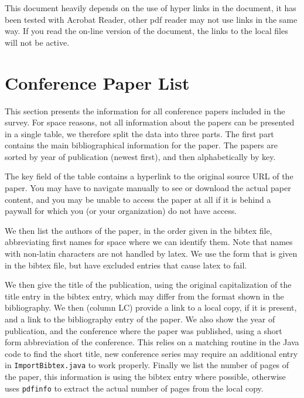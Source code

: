 \documentclass[a4paper]{article}
\begin{document}
This document heavily depends on the use of hyper links in the document, it has been tested with Acrobat Reader, other pdf reader may not use links in the same way. If you read the on-line version of the document, the links to the local files will not be active.

\clearpage


\section{Conference Paper List}

This section presents the information for all conference papers included in the survey. For space reasons, not all information about the papers can be presented in a single table, we therefore split the data into three parts. The first part contains the main bibliographical information for the paper. The papers are sorted by year of publication (newest first), and then alphabetically by key. 

The key field of the table contains a hyperlink to the original source URL of the paper. You may have to navigate manually to see or download the actual paper content, and you may be unable to access the paper at all if it is behind a paywall for which you (or your organization) do not have access.

We then list the authors of the paper, in the order given in the bibtex file, abbreviating first names for space where we can identify them. Note that names with non-latin characters are not handled by latex. We use the form that is given in the bibtex file, but have excluded entries that cause latex to fail.  

We then give the title of the publication, using the original capitalization of the title entry in the bibtex entry, which may differ from the format shown in the bibliography. We then (column LC) provide a link to a local copy, if it is present, and a link to the bibliography entry of the paper.  We also show the year of publication, and the conference where the paper was published, using a short form abbreviation of the conference. This relies on a matching routine in the Java code to find the short title, new conference series may require an additional entry in \texttt{ImportBibtex.java} to work properly. Finally we list the number of pages of the paper, this information is using the bibtex entry where possible, otherwise uses \texttt{pdfinfo} to extract the actual number of pages from the local copy. 
\end{document}
